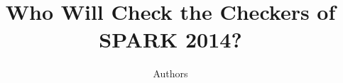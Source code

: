 \documentclass{llncs}
\begin{document}
\title{Who Will Check the Checkers of SPARK 2014?}


\author{Authors}


\maketitle













% 
% 
\end{document}
